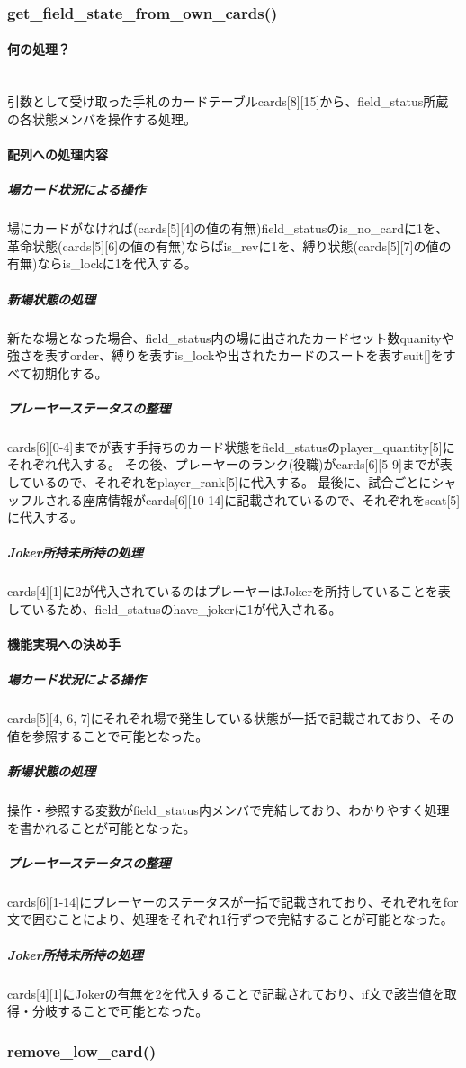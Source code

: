 \documentclass[11pt,a4paper, uplatex]{jsarticle}
\begin{document}
\subsubsection{get\_field\_state\_from\_own\_cards()}
\paragraph{何の処理？}\mbox{}\\
引数として受け取った手札のカードテーブルcards[8][15]から、field\_status所蔵の各状態メンバを操作する処理。
\paragraph{配列への処理内容}
\subparagraph{場カード状況による操作}
場にカードがなければ(cards[5][4]の値の有無)field\_statusのis\_no\_cardに1を、革命状態(cards[5][6]の値の有無)ならばis\_revに1を、縛り状態(cards[5][7]の値の有無)ならis\_lockに1を代入する。
\subparagraph{新場状態の処理}
新たな場となった場合、field\_status内の場に出されたカードセット数quanityや強さを表すorder、縛りを表すis\_lockや出されたカードのスートを表すsuit[]をすべて初期化する。
\subparagraph{プレーヤーステータスの整理}
cards[6][0-4]までが表す手持ちのカード状態をfield\_statusのplayer\_quantity[5]にそれぞれ代入する。
その後、プレーヤーのランク(役職)がcards[6][5-9]までが表しているので、それぞれをplayer\_rank[5]に代入する。
最後に、試合ごとにシャッフルされる座席情報がcards[6][10-14]に記載されているので、それぞれをseat[5]に代入する。
\subparagraph{Joker所持未所持の処理}
cards[4][1]に2が代入されているのはプレーヤーはJokerを所持していることを表しているため、field\_statusのhave\_jokerに1が代入される。
\paragraph{機能実現への決め手}
\subparagraph{場カード状況による操作}
cards[5][4, 6, 7]にそれぞれ場で発生している状態が一括で記載されており、その値を参照することで可能となった。
\subparagraph{新場状態の処理}
操作・参照する変数がfield\_status内メンバで完結しており、わかりやすく処理を書かれることが可能となった。
\subparagraph{プレーヤーステータスの整理}
cards[6][1-14]にプレーヤーのステータスが一括で記載されており、それぞれをfor文で囲むことにより、処理をそれぞれ1行ずつで完結することが可能となった。
\subparagraph{Joker所持未所持の処理}
cards[4][1]にJokerの有無を2を代入することで記載されており、if文で該当値を取得・分岐することで可能となった。
%
\subsubsection{remove\_low\_card()}
\end{document}
